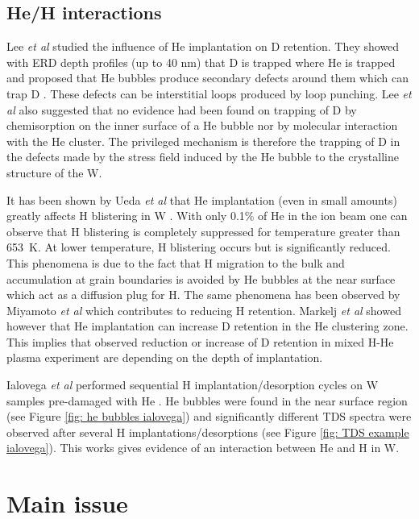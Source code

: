 \subsection{He/H interactions}
Lee \textit{et al} studied the influence of He implantation on D retention.
They showed with ERD depth profiles (up to 40 nm) that D is trapped where He is trapped and proposed that He bubbles produce secondary defects around them which can trap D .
These defects can be interstitial loops produced by loop punching.
Lee \textit{et al} also suggested that no evidence had been found on trapping of D by chemisorption on the inner surface of a He bubble nor by molecular interaction with the He cluster.
The privileged mechanism is therefore the trapping of D in the defects made by the stress field induced by the He bubble to the crystalline structure of the W.

It has been shown by Ueda \textit{et al} that He implantation (even in small amounts) greatly affects H blistering in W .
With only 0.1\% of He in the ion beam one can observe that H blistering is completely suppressed for temperature greater than \SI{653}{K}.
At lower temperature, H blistering occurs but is significantly reduced.
This phenomena is due to the fact that H migration to the bulk and accumulation at grain boundaries is avoided by He bubbles at the near surface which act as a diffusion plug for H.
The same phenomena has been observed by Miyamoto \textit{et al}  which contributes to reducing H retention.
Markelj \textit{et al}  showed however that He implantation can increase D retention in the He clustering zone.
This implies that observed reduction or increase of D retention in mixed H-He plasma experiment are depending on the depth of implantation.

Ialovega \textit{et al} performed sequential H implantation/desorption cycles on W samples pre-damaged with He .
He bubbles were found in the near surface region (see Figure \ref{fig: he bubbles ialovega}) and significantly different TDS spectra were observed after several H implantations/desorptions (see Figure \ref{fig: TDS example ialovega}).
This works gives evidence of an interaction between He and H in W.

\section{Main issue}


